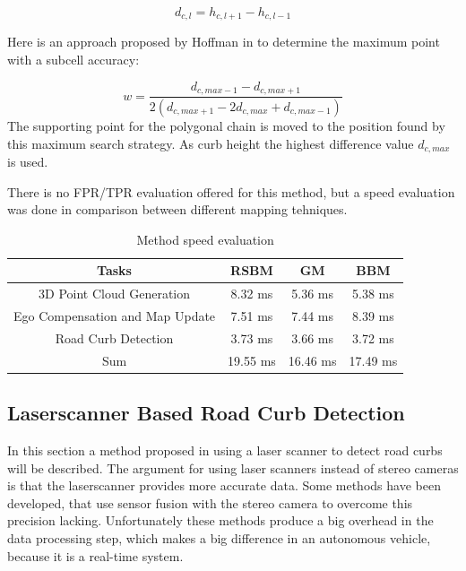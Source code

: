 \documentclass[conference]{IEEEtran}
\begin{document}
\begin{equation}
d_{c,l} = h_{c,l + 1} - h_{c,l -1}
\label{eq2}
\end{equation}

 Here is an approach proposed by Hoffman in \cite{hoffmann} to determine the maximum point with a subcell accuracy:



\begin{equation}
\label{eq4}
w = \frac{d_{c,max-1} - d_{c,max+1}}{2(d_{c,max+1} - 2d_{c,max} + d_{c,max-1})}
\end{equation}
The supporting point for the polygonal chain is moved to the position found by this maximum search strategy. As curb height the highest difference value $d_{c,max}$ is used. 


There is no FPR/TPR evaluation offered for this method, but a speed evaluation was done in comparison between different mapping tehniques.

\begin{table}[H]
\centering
\caption{Method speed evaluation}
\begin{tabular}{| c | c | c | c |}
\hline
Tasks & RSBM & GM & BBM \\
\hline
3D Point Cloud Generation & 8.32 ms & 5.36 ms & 5.38 ms \\
\hline
Ego Compensation and Map Update & 7.51 ms & 7.44 ms & 8.39 ms \\
\hline
Road Curb Detection & 3.73 ms & 3.66 ms & 3.72 ms \\
\hline
Sum & 19.55 ms & 16.46 ms & 17.49 ms \\
\hline
\end{tabular}
\end{table}

\subsection{Laserscanner Based Road Curb Detection}

In this section a method proposed in \cite{lidar13} using a laser scanner to detect road curbs will be described. The argument for using laser scanners instead of stereo cameras is that the laserscanner provides more accurate data. Some methods have been developed, that use sensor fusion with the stereo camera to overcome this precision lacking. Unfortunately these methods produce a big overhead in the data processing step, which makes a big difference in an autonomous vehicle, because it is a real-time system.
\end{document}
